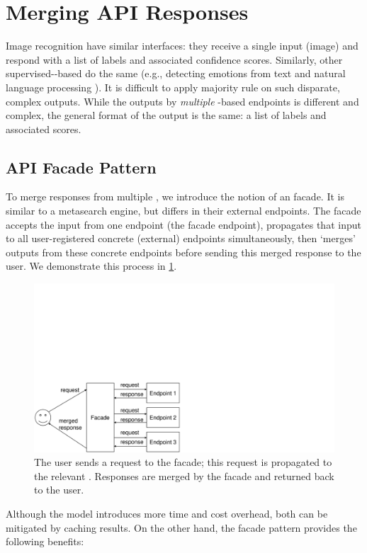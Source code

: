 \section{Merging API Responses}\label{icwe2019:sec:merging}

Image recognition  have similar interfaces: they receive a single input (image) and respond with a list of labels and associated confidence scores.
Similarly, other supervised--based  do the same (e.g., detecting emotions from text and natural language processing ). It is difficult to apply majority rule on such disparate, complex outputs. While the outputs by \textit{multiple} -based  endpoints is different and complex, the general format of the output is the same: a list of labels and associated scores.

\subsection{API Facade Pattern}

To merge responses from multiple , we introduce the notion of an  facade.
It is similar to a metasearch engine, but differs in their external endpoints.
The facade accepts the input from one  endpoint (the facade endpoint), propagates that input to all user-registered concrete (external)  endpoints simultaneously, then `merges' outputs from these concrete endpoints before sending this merged response to the  user. We demonstrate this process in \cref{icwe2019:fig:facade}.

\begin{figure}
\centering\includegraphics[width=.5\columnwidth,bb=0 0 466 229,clip]{figs1.pdf}
\caption[Overview of the proposed facade]{The user sends a request to the facade; this request is propagated to the relevant . Responses are merged by the facade and returned back to the user.}\label{icwe2019:fig:facade}
\end{figure}

Although the model introduces more time and cost overhead, both can be mitigated by caching results. On the other hand, the facade pattern provides the following benefits:

